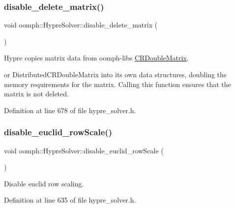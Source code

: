 \subsubsection{\texorpdfstring{disable\+\_\+delete\+\_\+matrix()}{disable\_delete\_matrix()}}
{\footnotesize\ttfamily void oomph\+::\+Hypre\+Solver\+::disable\+\_\+delete\+\_\+matrix (\begin{DoxyParamCaption}{ }\end{DoxyParamCaption})\hspace{0.3cm}{\ttfamily [inline]}}



Hypre copies matrix data from oomph-\/lib\textquotesingle{}s \hyperlink{classoomph_1_1CRDoubleMatrix}{C\+R\+Double\+Matrix}. 

or Distributed\+C\+R\+Double\+Matrix into its own data structures, doubling the memory requirements for the matrix. Calling this function ensures that the matrix is not deleted. 

Definition at line 678 of file hypre\+\_\+solver.\+h.

\mbox{\label{classoomph_1_1HypreSolver_a0cedd83299949fcc877c060e6dd7639f}} 
\subsubsection{\texorpdfstring{disable\+\_\+euclid\+\_\+row\+Scale()}{disable\_euclid\_rowScale()}}
{\footnotesize\ttfamily void oomph\+::\+Hypre\+Solver\+::disable\+\_\+euclid\+\_\+row\+Scale (\begin{DoxyParamCaption}{ }\end{DoxyParamCaption})\hspace{0.3cm}{\ttfamily [inline]}}



Disable euclid row scaling. 



Definition at line 635 of file hypre\+\_\+solver.\+h.

\mbox{\label{classoomph_1_1HypreSolver_a07def5b52e105be6f19a40f43e41548e}} 
